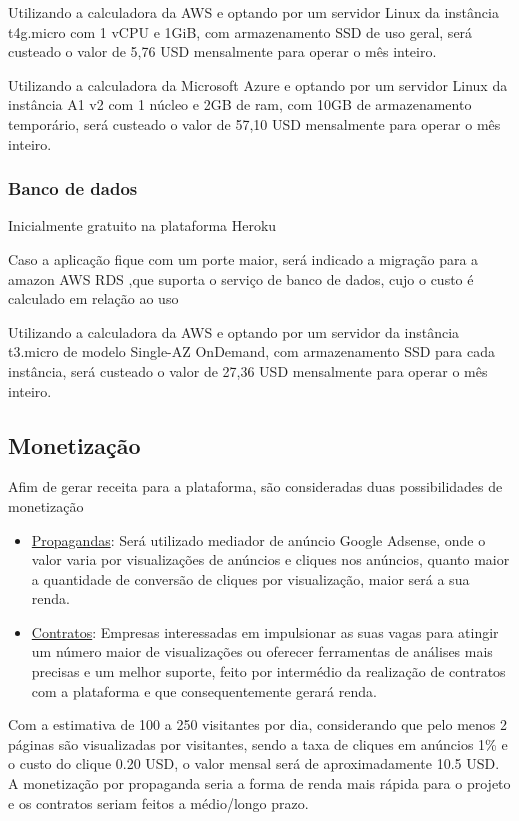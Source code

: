 Utilizando a calculadora da AWS e optando por um servidor Linux da instância
t4g.micro com 1 vCPU e 1GiB, com armazenamento SSD de uso geral, será
custeado o valor de 5,76 USD mensalmente para operar o mês inteiro.

Utilizando a calculadora da Microsoft Azure e optando por um servidor Linux da
instância A1 v2 com 1 núcleo e 2GB de ram, com 10GB de armazenamento temporário, será 
custeado o valor de 57,10 USD mensalmente para operar o mês inteiro.

\subsubsection{Banco de dados}
Inicialmente gratuito na plataforma Heroku

Caso a aplicação fique com um porte maior, será indicado a migração para a amazon AWS RDS%
,que suporta o serviço de banco de dados, cujo o custo é calculado em relação ao uso

Utilizando a calculadora da AWS e optando por um servidor da instância t3.micro
de modelo Single-AZ OnDemand, com armazenamento SSD para cada instância,
será custeado o valor de 27,36 USD mensalmente para operar o mês inteiro.

\subsection{Monetização}
Afim de gerar receita para a plataforma, são consideradas duas possibilidades de monetização

\begin{itemize}
    \item \underline{Propagandas}: Será utilizado mediador de anúncio Google Adsense, 
    onde o valor varia por visualizações de anúncios e cliques nos anúncios, quanto maior a quantidade de conversão
    de cliques por visualização, maior será a sua renda. 
    \item \underline{Contratos}: Empresas interessadas em impulsionar as suas vagas para atingir um número maior de visualizações ou 
    oferecer ferramentas de análises mais precisas e um melhor suporte, feito por intermédio da realização de contratos com a plataforma e 
    que consequentemente gerará renda.
\end{itemize}

Com a estimativa de 100 a 250 visitantes por dia, considerando que pelo menos 2 páginas são visualizadas por visitantes,
sendo a taxa de cliques em anúncios 1\% e o custo do clique 0.20 USD, o valor mensal será de aproximadamente 10.5 USD.
A monetização por propaganda seria a forma de renda mais rápida para o projeto e os contratos seriam feitos
a médio/longo prazo.


